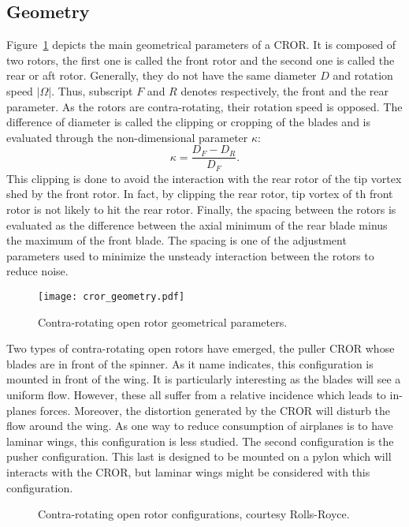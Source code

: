 
\subsection{Geometry}
\label{sub:cror_geometry}

Figure~\ref{fig:cror_geometry} depicts the main
geometrical parameters of a CROR.
It is composed of two rotors, the first one is called
the front rotor and the second one is called the rear or aft rotor.
Generally, they do not have the same diameter $D$ and rotation speed
$| \Omega |$. Thus, subscript $F$ and $R$ denotes respectively,
the front and the rear parameter.
As the rotors are contra-rotating, their rotation speed is opposed.
The difference of diameter is called the clipping or cropping
of the blades and is evaluated through the non-dimensional parameter
$\kappa$:
\begin{equation}
    \kappa = \frac{D_F - D_R}{D_F}.
\end{equation}
This clipping is done to avoid the interaction 
with the rear rotor of the tip vortex shed
by the front rotor. In fact, by clipping the rear
rotor, tip vortex of th front rotor is not likely
to hit the rear rotor.
Finally, the spacing between the rotors
is evaluated as the difference between the axial minimum of the
rear blade minus the maximum of the front blade. The spacing
is one of the adjustment parameters used to minimize the unsteady
interaction between the rotors to reduce noise.
\begin{figure}[htbp]
  \centering
  \texttt{[image: cror\_geometry.pdf]}
  \caption{Contra-rotating open rotor geometrical parameters.}
  \label{fig:cror_geometry}
\end{figure}

Two types of contra-rotating open rotors have emerged, the
puller CROR whose blades are in front of the spinner. As it
name indicates, this configuration is mounted in front of the
wing. It is particularly interesting as the blades will see
a uniform flow. However, these all suffer from a relative incidence
which leads to in-planes forces. Moreover, the distortion generated
by the CROR will disturb the flow around the wing. As one way to reduce
consumption of airplanes is to have laminar wings, this configuration
is less studied. The second configuration is the pusher
configuration. This last is designed to be mounted on a pylon which
will interacts with the CROR, but laminar wings might be considered with
this configuration.
\begin{figure}[htb]
  \centering
  \caption{Contra-rotating open rotor configurations, courtesy Rolls-Royce.}
  \label{fig:cror_architectures}
\end{figure}

